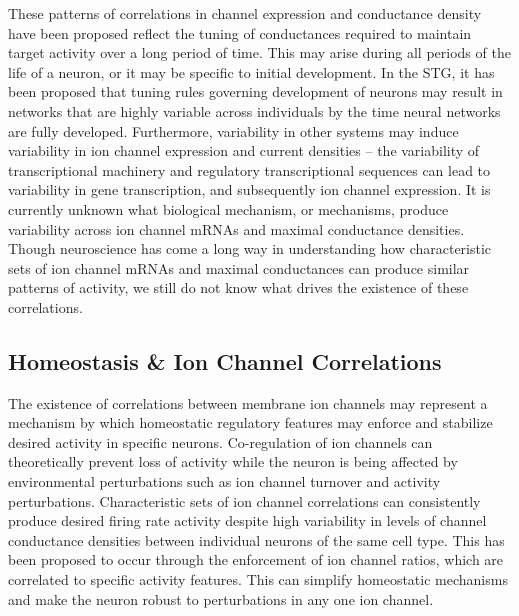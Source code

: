 These patterns of correlations in channel expression and conductance density have been proposed reflect the tuning of conductances required to maintain target activity over a long period of time\cite{marder_variability_2006,schulz_variable_2006}.
This may arise during all periods of the life of a neuron, or it may be specific to initial development. In the \ac{STG}, it has been proposed that tuning rules governing development of neurons may result in networks that are highly variable across individuals by the time neural networks are fully developed\cite{marder_development_2005,rehm_spectral_2008,rehm_developmental_2008}.
Furthermore, variability in other systems may induce variability in ion channel expression and current densities -- the variability of transcriptional machinery and regulatory transcriptional sequences can lead to variability in gene transcription, and subsequently ion channel expression\cite{blake_noise_2003,volfson_origins_2006}.
It is currently unknown what biological mechanism, or mechanisms, produce variability across ion channel mRNAs and maximal conductance densities. Though neuroscience has come a long way in understanding how characteristic sets of ion channel mRNAs and maximal conductances can produce similar patterns of activity, we still do not know what drives the existence of these correlations\cite{prinz_similar_2004}.

\subsection{Homeostasis \& Ion Channel Correlations} \label{corr_homeostasis}
The existence of correlations between membrane ion channels may represent a mechanism by which homeostatic regulatory features may enforce and stabilize desired activity in specific neurons\cite{schulz_quantitative_2007}.
Co-regulation of ion channels can theoretically prevent loss of activity while the neuron is being affected by environmental perturbations such as ion channel turnover and activity perturbations\cite{oleary_correlations_2013,maclean_activity-independent_2003,bergquist_hierarchy_2010}.
Characteristic sets of ion channel correlations can consistently produce desired firing rate activity despite high variability in levels of channel conductance densities between individual neurons of the same cell type.
This has been proposed to occur through the enforcement of ion channel ratios, which are correlated to specific activity features. This can simplify homeostatic mechanisms and make the neuron robust to perturbations in any one ion channel\cite{schulz_quantitative_2007,maclean_activity-independent_2005,ball_coregulation_2010,burdakov_physiological_2005}.

